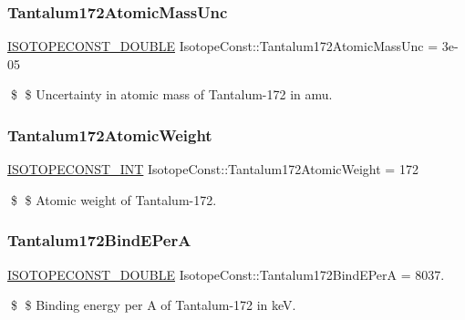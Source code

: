 \subsubsection{\texorpdfstring{Tantalum172\+Atomic\+Mass\+Unc}{Tantalum172AtomicMassUnc}}
{\footnotesize\ttfamily \mbox{\hyperlink{group___isotope_const-_macros_ga8f45a7272ce02c0b4c65c44636ed719a}{I\+S\+O\+T\+O\+P\+E\+C\+O\+N\+S\+T\+\_\+\+D\+O\+U\+B\+LE}} Isotope\+Const\+::\+Tantalum172\+Atomic\+Mass\+Unc = 3e-\/05}

\$ \$ Uncertainty in atomic mass of Tantalum-\/172 in amu. \mbox{\label{group___isotope_const-_tantalum-_ta172_ga4bb68f2abf72e0086eb7d1440550393d}} 
\subsubsection{\texorpdfstring{Tantalum172\+Atomic\+Weight}{Tantalum172AtomicWeight}}
{\footnotesize\ttfamily \mbox{\hyperlink{group___isotope_const-_macros_ga5f18360b3e99483a35c32d789e62621c}{I\+S\+O\+T\+O\+P\+E\+C\+O\+N\+S\+T\+\_\+\+I\+NT}} Isotope\+Const\+::\+Tantalum172\+Atomic\+Weight = 172}

\$ \$ Atomic weight of Tantalum-\/172. \mbox{\label{group___isotope_const-_tantalum-_ta172_ga51275a165036904b8f6c3391784df208}} 
\subsubsection{\texorpdfstring{Tantalum172\+Bind\+E\+PerA}{Tantalum172BindEPerA}}
{\footnotesize\ttfamily \mbox{\hyperlink{group___isotope_const-_macros_ga8f45a7272ce02c0b4c65c44636ed719a}{I\+S\+O\+T\+O\+P\+E\+C\+O\+N\+S\+T\+\_\+\+D\+O\+U\+B\+LE}} Isotope\+Const\+::\+Tantalum172\+Bind\+E\+PerA = 8037.}

\$ \$ Binding energy per A of Tantalum-\/172 in keV. \mbox{\label{group___isotope_const-_tantalum-_ta172_ga688fa0b9eef0416af242fcc1461f0e16}} 
